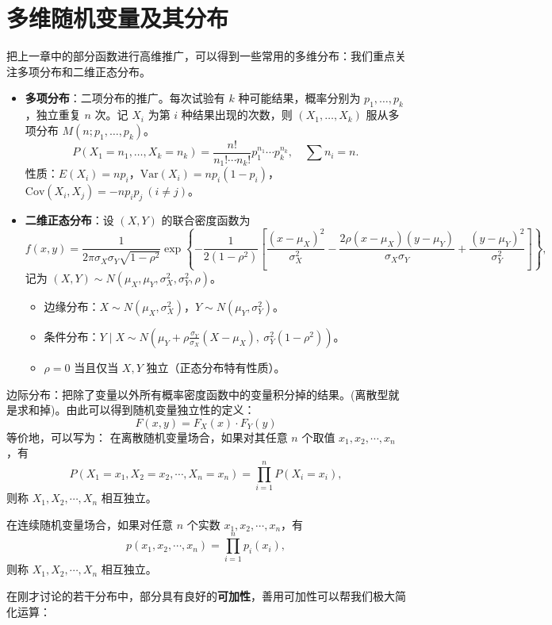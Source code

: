 \documentclass[a4paper]{ctexart}
\begin{document}
\section{多维随机变量及其分布}
把上一章中的部分函数进行高维推广，可以得到一些常用的多维分布：我们重点关注多项分布和二维正态分布。
\begin{itemize}
    \item \textbf{多项分布}：二项分布的推广。每次试验有 $k$ 种可能结果，概率分别为 $p_1,\ldots,p_k$，独立重复 $n$ 次。记 $X_i$ 为第 $i$ 种结果出现的次数，则 $(X_1,\ldots,X_k)$ 服从多项分布 $M(n; p_1,\ldots,p_k)$。
    \[
    P(X_1=n_1,\ldots,X_k=n_k) = \frac{n!}{n_1!\cdots n_k!} p_1^{n_1}\cdots p_k^{n_k},\quad \sum n_i = n.
    \]
    性质：$E(X_i)=np_i$，$\mathrm{Var}(X_i)=np_i(1-p_i)$，$\mathrm{Cov}(X_i,X_j)=-np_ip_j\ (i\neq j)$。

    \item \textbf{二维正态分布}：设 $(X,Y)$ 的联合密度函数为
    \[
    f(x,y) = \frac{1}{2\pi\sigma_X\sigma_Y\sqrt{1-\rho^2}} \exp\left\{ -\frac{1}{2(1-\rho^2)} \left[ \frac{(x-\mu_X)^2}{\sigma_X^2} - \frac{2\rho(x-\mu_X)(y-\mu_Y)}{\sigma_X\sigma_Y} + \frac{(y-\mu_Y)^2}{\sigma_Y^2} \right] \right\},
    \]
    记为 $(X,Y) \sim N(\mu_X,\mu_Y,\sigma_X^2,\sigma_Y^2,\rho)$。
    \begin{itemize}
        \item 边缘分布：$X \sim N(\mu_X,\sigma_X^2)$，$Y \sim N(\mu_Y,\sigma_Y^2)$。
        \item 条件分布：$Y\mid X \sim N\left(\mu_Y + \rho\frac{\sigma_Y}{\sigma_X}(X-\mu_X),\ \sigma_Y^2(1-\rho^2)\right)$。
        \item $\rho=0$ 当且仅当 $X,Y$ 独立（正态分布特有性质）。
    \end{itemize}
\end{itemize}
边际分布：把除了变量以外所有概率密度函数中的变量积分掉的结果。(离散型就是求和掉)。由此可以得到随机变量独立性的定义：
\begin{equation}
    F(x,y) = F_X(x) \cdot F_Y(y)
\end{equation}
等价地，可以写为：
在离散随机变量场合，如果对其任意 \(n\) 个取值 \(x_1, x_2, \cdots, x_n\)，有
\[
P(X_1 = x_1, X_2 = x_2, \cdots, X_n = x_n) = \prod_{i=1}^n P(X_i = x_i),
\]
则称 \(X_1, X_2, \cdots, X_n\) 相互独立。

在连续随机变量场合，如果对任意 \(n\) 个实数 \(x_1, x_2, \cdots, x_n\)，有
\[
p(x_1, x_2, \cdots, x_n) = \prod_{i=1}^n p_i(x_i),
\]
则称 \(X_1, X_2, \cdots, X_n\) 相互独立。

在刚才讨论的若干分布中，部分具有良好的\textbf{可加性}，善用可加性可以帮我们极大简化运算：
\end{document}
